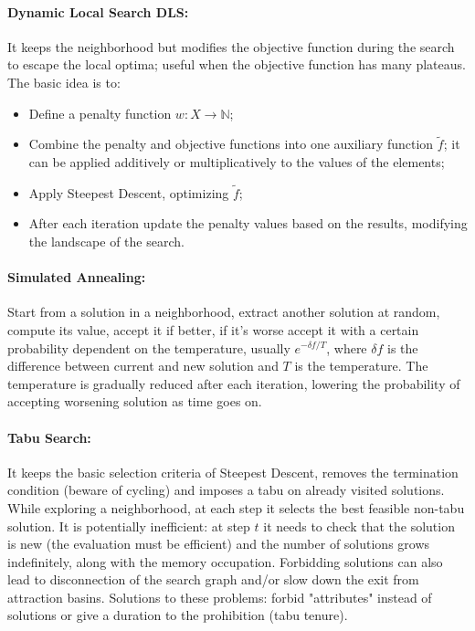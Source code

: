\documentclass{article}
\begin{document}
	\paragraph{Dynamic Local Search DLS:} It keeps the neighborhood but modifies the objective function during the search to escape the local optima; useful when the objective function has many plateaus. The basic idea is to: 
	\begin{itemize}
		\item Define a penalty function $w: X \rightarrow \mathbb{N}$;
		\item Combine the penalty and objective functions into one auxiliary function $\tilde f$; it can be applied additively or multiplicatively to the values of the elements;
		\item Apply Steepest Descent, optimizing $\tilde f$;
		\item After each iteration update the penalty values based on the results, modifying the landscape of the search.\\
	\end{itemize}
	
	\paragraph{Simulated Annealing:} Start from a solution in a neighborhood, extract another solution at random, compute its value, accept it if better, if it's worse accept it with a certain probability dependent on the temperature, usually $e^{-\delta f / T}$, where $\delta f$ is the difference between current and new solution and $T$ is the temperature. The temperature is gradually reduced after each iteration, lowering the probability of accepting worsening solution as time goes on.\\
	
	\paragraph{Tabu Search:} It keeps the basic selection criteria of Steepest Descent, removes the termination condition (beware of cycling) and imposes a tabu on already visited solutions. While exploring a neighborhood, at each step it selects the best feasible non-tabu solution. It is potentially inefficient: at step $t$ it needs to check that the solution is new (the evaluation must be efficient) and the number of solutions grows indefinitely, along with the memory occupation. Forbidding solutions can also lead to disconnection of the search graph and/or slow down the exit from attraction basins. Solutions to these problems: forbid "attributes" instead of solutions or give a duration to the prohibition (tabu tenure).\\
	
\end{document}
